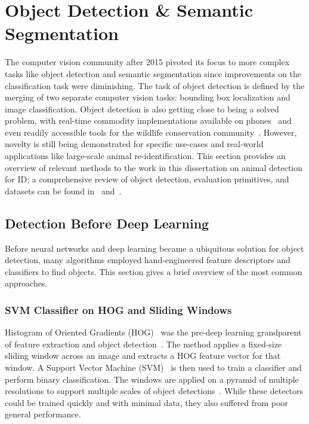 \section{Object Detection \& Semantic Segmentation}

The computer vision community after 2015 pivoted its focus to more complex tasks like object detection and semantic segmentation since improvements on the classification task were diminishing.  The task of object detection is defined by the merging of two separate computer vision tasks: bounding box localization and image classification.  Object detection is also getting close to being a solved problem, with real-time commodity implementations available on phones~\cite{howard_mobilenets_2017} and even readily accessible tools for the wildlife conservation community~\cite{beery_efficient_2019}. However, novelty is still being demonstrated for specific use-cases and real-world applications like large-scale animal re-identification.  This section provides an overview of relevant methods to the work in this dissertation on animal detection for ID; a comprehensive review of object detection, evaluation primitives, and datasets can be found in~\cite{liu_deep_2019} and~\cite{zhao_object_2019}.

\subsection{Detection Before Deep Learning}

Before neural networks and deep learning became a ubiquitous solution for object detection, many algorithms employed hand-engineered feature descriptors and classifiers to find objects.  This section gives a brief overview of the most common approaches.

\subsubsection{SVM Classifier on HOG and Sliding Windows}

Histogram of Oriented Gradients (HOG)~\cite{dalal_histograms_2005} was the pre-deep learning grandparent of feature extraction and object detection~\cite{felzenszwalb_discriminatively_2008,vondrick_hog-gles:_2013,felzenszwalb_object_2010}.  The method applies a fixed-size sliding window across an image and extracts a HOG feature vector for that window.  A Support Vector Machine (SVM)~\cite{cortes_support-vector_1995} is then used to train a classifier and perform binary classification.  The windows are applied on a pyramid of multiple resolutions to support multiple scales of object detections~\cite{malisiewicz_ensemble_2011}.  While these detectors could be trained quickly and with minimal data, they also suffered from poor general performance.

